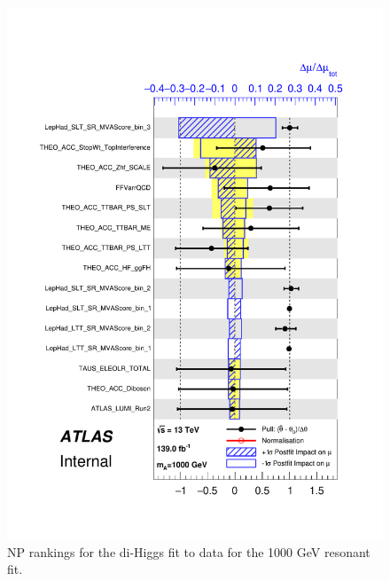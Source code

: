    \begin{figure}
   \centering
   \includegraphics[width=.8\textwidth]{figures/results/HH/LepHad/pulls_SigXsecOverSM_1000.pdf}
   \caption{NP rankings for the di-Higgs \lephad fit to data for the 1000 GeV resonant fit.}
   \label{fig:LepHadPostfitNPRankings2HDM1000}
   \end{figure}
   
